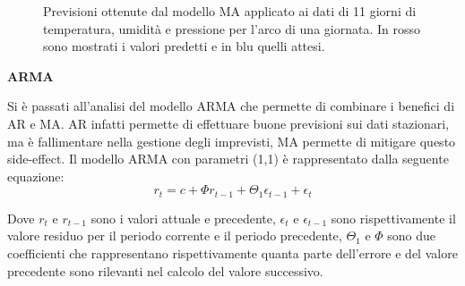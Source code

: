 \documentclass{article}
\begin{document}
\begin{figure}
    \centering
    \qquad
    \qquad
    \caption{Previsioni ottenute dal modello
    MA applicato ai dati di 11 giorni di temperatura, umidità e pressione per l'arco di una giornata. In rosso sono mostrati i valori predetti e in blu quelli attesi.}
    \label{fig:ma}
\end{figure}


\bigskip
\textbf{ARMA}
\medskip

Si è passati all'analisi del modello ARMA che permette di combinare i benefici di AR e MA. AR infatti permette di effettuare buone previsioni sui dati stazionari, ma è fallimentare nella gestione degli imprevisti, MA permette di mitigare questo side-effect. Il modello ARMA con parametri (1,1) è rappresentato dalla seguente equazione\cite{arima}:
$$r_t = c + \Phi r_{t-1} + \Theta_1\epsilon_{t-1} + \epsilon_t$$

Dove $r_t$ e $r_{t-1}$ sono i valori attuale e precedente, $\epsilon_t$ e $\epsilon_{t-1}$ sono rispettivamente il valore residuo per il periodo corrente e il periodo precedente, $\Theta_1$ e $\Phi$ sono due coefficienti che rappresentano rispettivamente quanta parte dell'errore e del valore precedente sono rilevanti nel calcolo del valore successivo.
\end{document}
